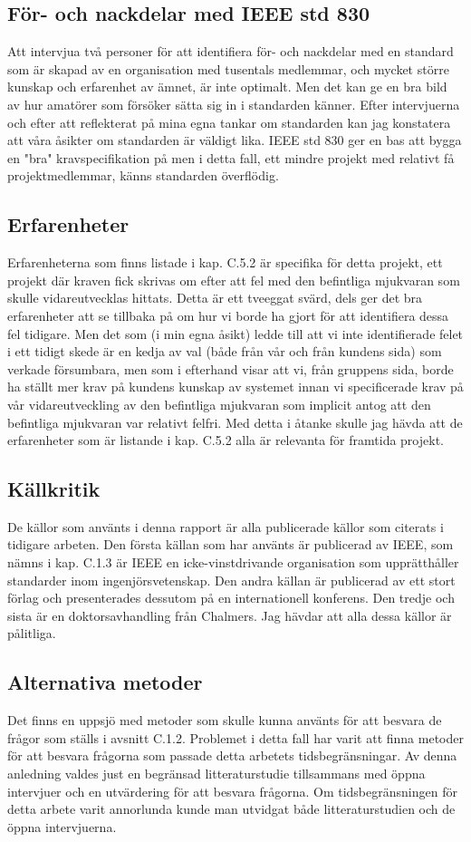 \subsection{För- och nackdelar med IEEE std 830}
Att intervjua två personer för att identifiera för- och nackdelar med en standard som är skapad av en organisation med tusentals medlemmar, och mycket större kunskap och erfarenhet av ämnet, är inte optimalt. Men det kan ge en bra bild av hur amatörer som försöker sätta sig in i standarden känner. Efter intervjuerna och efter att reflekterat på mina egna tankar om standarden kan jag konstatera att våra åsikter om standarden är väldigt lika. IEEE std 830 ger en bas att bygga en "bra" kravspecifikation på men i detta fall, ett mindre projekt med relativt få projektmedlemmar, känns standarden överflödig.   
\subsection{Erfarenheter}
Erfarenheterna som finns listade i kap. C.5.2 är specifika för detta projekt, ett projekt där kraven fick skrivas om efter att fel med den befintliga mjukvaran som skulle vidareutvecklas hittats. Detta är ett tveeggat svärd, dels ger det bra erfarenheter att se tillbaka på om hur vi borde ha gjort för att identifiera dessa fel tidigare. Men det som (i min egna åsikt) ledde till att vi inte identifierade felet i ett tidigt skede är en kedja av val (både från vår och från kundens sida) som verkade försumbara, men som i efterhand visar att vi, från gruppens sida, borde ha ställt mer krav på kundens kunskap av systemet innan vi specificerade krav på vår vidareutveckling av den befintliga mjukvaran som implicit antog att den befintliga mjukvaran var relativt felfri. Med detta i åtanke skulle jag hävda att de erfarenheter som är listande i kap. C.5.2 alla är relevanta för framtida projekt.      
\subsection{Källkritik}
De källor som använts i denna rapport är alla publicerade källor som citerats i tidigare arbeten. Den första källan som har använts är publicerad av IEEE, som nämns i kap. C.1.3 är IEEE en icke-vinstdrivande organisation som upprätthåller standarder inom ingenjörsvetenskap. Den andra källan är publicerad av ett stort förlag och presenterades dessutom på en internationell konferens. Den tredje och sista är en doktorsavhandling från Chalmers. Jag hävdar att alla dessa källor är pålitliga.      
\subsection{Alternativa metoder}
Det finns en uppsjö  med metoder som skulle kunna använts för att besvara de frågor som ställs i avsnitt C.1.2. Problemet i detta fall har varit att finna metoder för att besvara frågorna som passade detta arbetets tidsbegränsningar. Av denna anledning valdes just en begränsad litteraturstudie tillsammans med öppna intervjuer och en utvärdering för att besvara frågorna. Om tidsbegränsningen för detta arbete varit annorlunda kunde man utvidgat både litteraturstudien och de öppna intervjuerna.   
